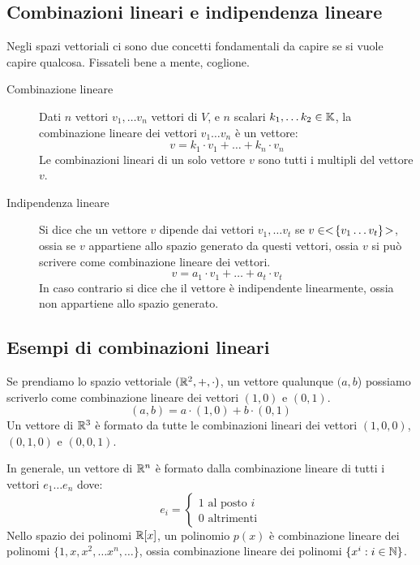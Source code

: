 \subsection{Combinazioni lineari e indipendenza lineare}

Negli spazi vettoriali ci sono due concetti fondamentali da capire se si vuole capire qualcosa. Fissateli bene a mente, coglione.

\begin{description}
    \item[Combinazione lineare] Dati $n$ vettori $v_1, \dots v_n$ vettori di $V$, e $n$ scalari $k_1, \dots k_2 \in \mathbb{K}$, la combinazione lineare dei vettori $v_1 \dots v_n$ \`e un vettore:
    \[
    v = k_1 \cdot v_1 + \dots + k_n \cdot v_n
    \]
    Le combinazioni lineari di un solo vettore $v$ sono tutti i multipli del vettore $v$.
    \item[Indipendenza lineare] Si dice che un vettore $v$ dipende dai vettori $v_1, \dots v_t$ se $v \in <\!{\{v_1 \dots v_t\}}\!>$, ossia se $v$ appartiene allo spazio generato da questi vettori, ossia $v$ si pu\`o scrivere come combinazione lineare dei vettori.
    \[
    v = a_1 \cdot v_1 + \dots + a_t \cdot v_t
    \]
    In caso contrario si dice che il vettore \`e indipendente linearmente, ossia non appartiene allo spazio generato.
\end{description}

\subsection{Esempi di combinazioni lineari}

Se prendiamo lo spazio vettoriale $(\mathbb{R}^2, +, \cdot)$, un vettore qualunque $(a,b$) possiamo scriverlo come combinazione lineare dei vettori $(1,0)$ e $(0,1)$.
\[
(a,b) = a \cdot (1, 0) + b \cdot (0, 1)
\]
Un vettore di $\mathbb{R}^3$ \`e formato da tutte le combinazioni lineari dei vettori $(1,0,0)$, $(0,1,0)$ e $(0,0,1)$.

In generale, un vettore di $\mathbb{R}^n$ \`e formato dalla combinazione lineare di tutti i vettori $e_1 \dots e_n$ dove:
\[
e_i =
\begin{cases}
1 \text{ al posto } i \\
0 \text{ altrimenti}
\end{cases}
\]
Nello spazio dei polinomi $\mathbb{R}[x]$, un polinomio $p(x)$ \`e combinazione lineare dei polinomi $\{ 1, x, x^2, \dots x^n, \dots \}$, ossia combinazione lineare dei polinomi $\{ x^i : i \in \mathbb{N} \}$.

